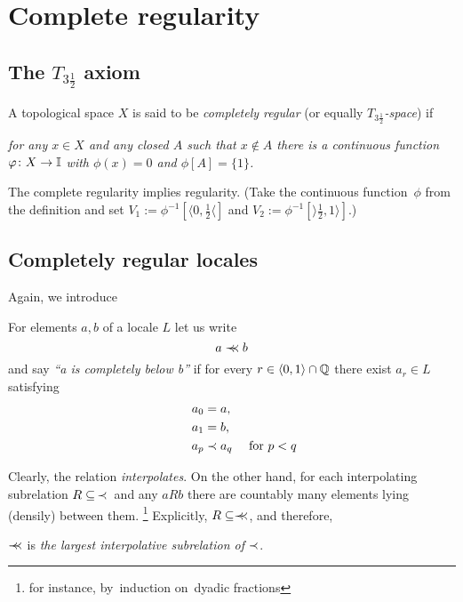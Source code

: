 \chapter{Complete regularity}

\section{The $T_{3\frac{1}{2}}$ axiom}

\begin{framed}
  \begin{df}[$T_{3\frac{1}{2}}$]
    A topological space $X$ is said to be \emph{completely regular\/} (or
    equally \emph{$T_{3\frac{1}{2}}$-space\/}) if
    \begin{center} \it
      for any $x\in X$ and any closed $A$ such that $x\not\in A$ there is a
      continuous function $\varphi\colon X \to \mathbb{I}$ with $\phi(x) = 0$ and $\phi[A]
      = \{1\}$.
    \end{center}
  \end{df}
\end{framed}

\begin{rem}
  The complete regularity implies regularity.
  (Take the continuous function~$\phi$ from the definition and set $V_1 :=
  \phi^{-1}[\langle 0, \frac{1}{2} \langle]$ and $V_2 := \phi^{-1}[\rangle
  \frac{1}{2}, 1 \rangle]$.)
\end{rem}

\section{Completely regular locales}

Again, we introduce

\begin{framed}
  \begin{nota}[$\cb$]
    For elements $a, b$ of a locale $L$ let us write
    \[
      a \prec\mkern-8mu\prec b
    \]
    and say \emph{``a is completely below b''\/} if for every $r\in \langle 0,
    1 \rangle \cap \mathbb{Q}$ there exist $a_r\in L$ satisfying
    \begin{align*}
      a_0 &= a, \\
      a_1 &= b, \\
      \qquad a_p &\prec a_q \quad \text{ for } p < q
    \end{align*}
  \end{nota}
\end{framed}

\begin{rem} \label{cb-largest-interpol}
  Clearly, the relation \emph{interpolates\/}.
  On the other hand, for each interpolating subrelation $R\subseteq \, \prec \, $
  and any $a R b$ there are countably many elements lying (densily) between
  them.\thinspace%
  \footnote{for instance, by~induction on~dyadic fractions}
  Explicitly, $R\subseteq \prec\mkern-8mu\prec$, and therefore,
  \begin{center}
    $\cb$ is \emph{the largest interpolative subrelation of $\prec$\/}.
  \end{center}
\end{rem}

